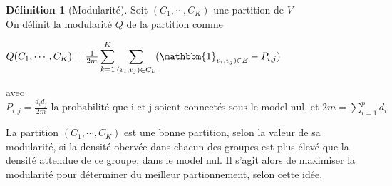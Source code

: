 \documentclass[frenchb]{report}
\newcommand{\1}{\mathbbm{1}}
\theoremstyle{definition}\newtheorem{defn}{Définition}
\theoremstyle{definition}\newtheorem{exm}{Exemple}
\theoremstyle{definition}\newtheorem{nota}{Notation}
\theoremstyle{definition}\newtheorem{rem}{Remarque}
\begin{document}
\begin{defn}[Modularité]
Soit $(C_1,\cdots,C_K)$ une partition de $V$\\
On définit la modularité $Q$ de la partition comme 
\begin{center}
$Q(C_1,\cdots,C_K) = \frac{1}{2m}\displaystyle\sum_{k=1}^K \displaystyle\sum_{(v_i,v_j)\in C_k} (\1_{v_i,v_j) \in E} - P_{i,j})$
\end{center}
avec $P_{i,j} = \frac{d_i d_j}{2m} \text{ la probabilité que i et j soient connectés sous le model nul, et } 2m = \displaystyle\sum_{i=1}^p d_i$
\end{defn}

La partition $(C_1,\cdots,C_K)$ est une bonne partition, selon la valeur de sa modularité, si la densité obervée dans chacun des groupes est plus élevé que la densité attendue de ce groupe, dans le model nul.
Il s'agit alors de maximiser la modularité pour déterminer du meilleur partionnement, selon cette idée.\\
\end{document}
